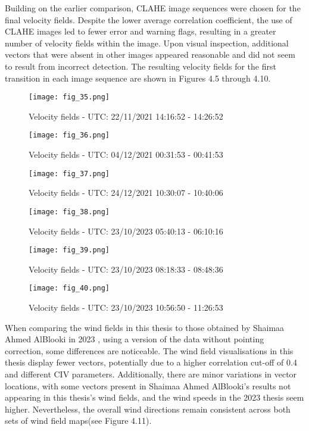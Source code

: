 Building on the earlier comparison, CLAHE image sequences were chosen for the final velocity fields. Despite the lower average correlation coefficient, the use of CLAHE images led to fewer error and warning flags, resulting in a greater number of velocity fields within the image. Upon visual inspection, additional vectors that were absent in other images appeared reasonable and did not seem to result from incorrect detection. The resulting velocity fields for the first transition in each image sequence are shown in Figures 4.5 through 4.10.
\FloatBarrier
\begin{figure}[h!] 
    \centering
    \texttt{[image: fig\_35.png]}
    \caption{Velocity fields - UTC: 22/11/2021 14:16:52 - 14:26:52}
\end{figure}
\FloatBarrier
\begin{figure}[h!] 
    \centering
    \texttt{[image: fig\_36.png]}
    \caption{Velocity fields - UTC: 04/12/2021 00:31:53 - 00:41:53}
\end{figure}
\FloatBarrier
\begin{figure}[h!] 
    \centering
    \texttt{[image: fig\_37.png]}
    \caption{Velocity fields - UTC: 24/12/2021 10:30:07 - 10:40:06}
\end{figure}
\FloatBarrier
\begin{figure}[h!] 
    \centering
    \texttt{[image: fig\_38.png]}
    \caption{Velocity fields - UTC: 23/10/2023 05:40:13 - 06:10:16}
\end{figure}
\FloatBarrier
\begin{figure}[h!] 
    \centering
    \texttt{[image: fig\_39.png]}
    \caption{Velocity fields - UTC: 23/10/2023 08:18:33 - 08:48:36}
\end{figure}
\FloatBarrier
\begin{figure}[h!] 
    \centering
    \texttt{[image: fig\_40.png]}
    \caption{Velocity fields - UTC: 23/10/2023 10:56:50 - 11:26:53}
\end{figure}
\FloatBarrier
When comparing the wind fields in this thesis to those obtained by Shaimaa Ahmed AlBlooki in 2023 \cite{AlBlooki2023}, using a version of the data without pointing correction, some differences are noticeable. The wind field visualisations in this thesis display fewer vectors, potentially due to a higher correlation cut-off of 0.4 and different CIV parameters. Additionally, there are minor variations in vector locations, with some vectors present in Shaimaa Ahmed AlBlooki's results not appearing in this thesis’s wind fields, and the wind speeds in the 2023 thesis seem higher. Nevertheless, the overall wind directions remain consistent across both sets of wind field maps(see Figure 4.11).
